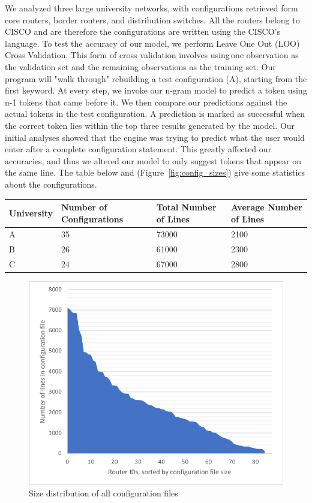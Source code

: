 We analyzed three large university networks, with configurations retrieved form core routers, border routers, and distribution switches. All the routers belong to CISCO and are therefore the configurations are written using the CISCO's language. To test the accuracy of our model, we perform Leave One Out (LOO) Cross Validation. This form of cross validation involves using one observation as the validation set and the remaining observations as the training set. Our program will "walk through" rebuilding a test configuration (A), starting from the first keyword. At every step, we invoke our n-gram model to predict a token using n-1 tokens that came before it. We then compare our predictions against the actual tokens in the test configuration. A prediction is marked as successful when the correct token lies within the top three results generated by the model. Our initial analyses showed that the engine was trying to predict what the user would enter after a complete configuration statement. This greatly affected our accuracies, and thus we altered our model to only suggest tokens that appear on the same line. The table below and (Figure~\ref{fig:config_sizes}) give some statistics about the configurations.
\begin{center}
    \begin{tabular}{ | p{1.5cm} | p{1.5cm}| p{2cm} |  p{1.5cm} |} 
    \hline
    University & Number of Configurations & Total Number of Lines & Average Number of Lines \\ \hline
    A & 35 & 73000 & 2100 \\  \hline
    B & 26 & 61000 & 2300 \\ \hline
    C & 24 & 67000 & 2800 \\  \hline
    \end{tabular}
\end{center}
\begin{figure}
	\centering
	\includegraphics[width=\columnwidth]{config_sizes.png}
	\caption{Size distribution of all configuration files}
    \label{fig:uni_analysis}
\end{figure}

